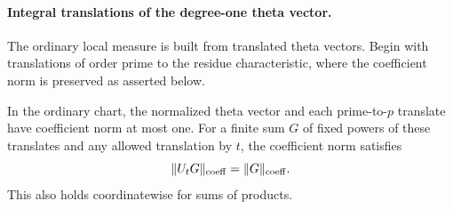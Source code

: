 \paragraph{Integral translations of the degree-one theta vector.}

The ordinary local measure is built from translated theta vectors. Begin with translations of order prime to the residue characteristic, where the coefficient norm is preserved as asserted below.

\begin{proposition}\label{prop:word-integral-translates}
In the ordinary chart, the normalized theta vector and
each prime-to-\(p\) translate have coefficient norm at
most one. For a finite sum \(G\) of fixed powers of these translates and any allowed translation by \(t\), the coefficient norm satisfies
\[
 \|U_tG\|_{\rm coeff}=\|G\|_{\rm coeff}.
\]
 This
also holds coordinatewise for sums of products.
\end{proposition}

